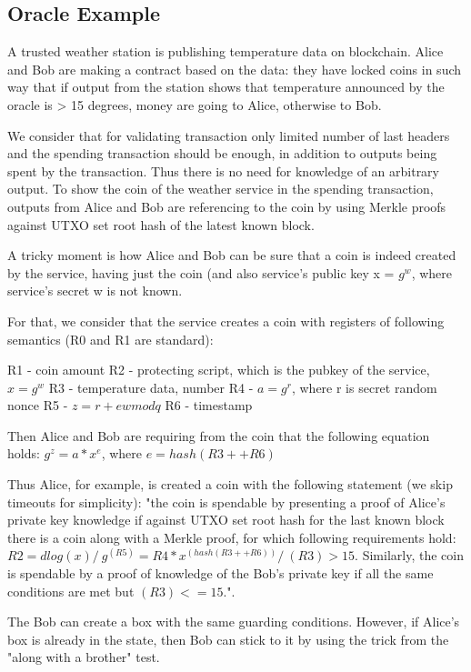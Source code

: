 \documentclass[11pt]{llncs}
\newcommand{\authnote}[2]{\marginpar{\parbox{\marginparwidth}{\tiny %
  \textsf{#1 {\textcolor{blue}{notes: #2}}}}}%
  \textcolor{blue}{\textbf{\dag}}}
\newcommand{\authnote}[2]{
  \textsf{#1 \textcolor{blue}{: #2}}}
\newcommand{\authnote}[2]{}
\newcommand{\knote}[1]{{\authnote{\textcolor{green}{kushti notes}}{#1}}}
\begin{document}
\subsection{Oracle Example}

\knote{Text below is just copied from code comments, polish it}

A trusted weather station is publishing temperature data on blockchain. Alice and Bob are making a contract based on the data:
they have locked coins in such way that if output from the station shows that temperature announced by the oracle is > 15 degrees, money are going to Alice, otherwise to Bob.
    
We consider that for validating transaction only limited number of last headers and the spending transaction should be enough, in addition to outputs being spent by the transaction. Thus there is no need for knowledge of an arbitrary output. To show the coin of the weather service in the spending transaction, outputs from Alice and Bob are referencing to the coin by using Merkle proofs against UTXO set root hash of the latest known block.
    
A tricky moment is how Alice and Bob can be sure that a coin is indeed created by the service, having just the coin (and also service's public key x = $g^w$, where service's secret w is not known.
    
For that, we consider that the service creates a coin with registers of following semantics (R0 and R1 are standard):
    
R1 - coin amount
R2 - protecting script, which is the pubkey of the service, $x = g^w$
R3 - temperature data, number
R4 - $a = g^r$, where r is secret random nonce
R5 - $z = r + ew mod q$
R6 - timestamp
    
Then Alice and Bob are requiring from the coin that the following equation holds: $g^z = a * x^e$, where $e = hash(R3 ++ R6)$
    
Thus Alice, for example, is created a coin with the following statement (we skip timeouts for simplicity):
"the coin is spendable by presenting a proof of Alice's private key knowledge if against UTXO set root hash for
the last known block there is a coin along with a Merkle proof, for which following requirements hold:
$R2 = dlog(x) /\ g^(R5) = R4 * x^(hash(R3 ++ R6)) /\ (R3) > 15$. Similarly, the coin is spendable by a proof of
knowledge of the Bob's private key if all the same conditions are met but $(R3) <= 15$.".
    
The Bob can create a box with the same guarding conditions. However, if Alice's box is already in the state, then Bob can stick to it by using the trick from the "along with a brother" test.
\end{document}
